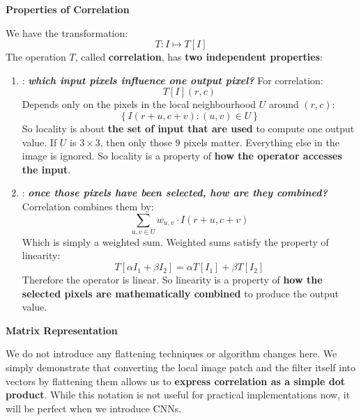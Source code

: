 \highspace
\begin{flushleft}
    \textcolor{Green3}{ \textbf{Properties of Correlation}}
\end{flushleft}
We have the transformation:
\begin{equation*}
    T: I \mapsto T[I]
\end{equation*}
The operation $T$, called \textbf{correlation}, has \textbf{two independent properties}:
\begin{enumerate}
    \item {}: \emph{\textbf{which input pixels influence one output pixel?}} For correlation:
    \begin{equation*}
        T[I](r,c)
    \end{equation*}
    Depends only on the pixels in the local neighbourhood $U$ around $(r,c)$:
    \begin{equation*}
        \left\{I(r+u, c+v) : (u,v) \in U\right\}
    \end{equation*}
    So locality is about \textbf{the set of input that are used} to compute one output value. If $U$ is $3 \times 3$, then only those $9$ pixels matter. Everything else in the image is ignored. So locality is a property of \textbf{how the operator accesses the input}.


    \item {}: \emph{\textbf{once those pixels have been selected, how are they combined?}} Correlation combines them by:
    \begin{equation*}
        \sum_{u,v \in U} w_{u,v} \cdot I(r+u, c+v)
    \end{equation*}
    Which is simply a weighted sum. Weighted sums satisfy the property of linearity:
    \begin{equation*}
        T[\alpha I_1 + \beta I_2] = \alpha T[I_1] + \beta T[I_2]
    \end{equation*}
    Therefore the operator is linear. So linearity is a property of \textbf{how the selected pixels are mathematically combined} to produce the output value.
\end{enumerate}

\highspace
\begin{flushleft}
    \textcolor{Green3}{ \textbf{Matrix Representation}}
\end{flushleft}
We do not introduce any flattening techniques or algorithm changes here. We simply demonstrate that converting the local image patch and the filter itself into vectors by flattening them allows us to \textbf{express correlation as a simple dot product}. While this notation is not useful for practical implementations now, it will be perfect when we introduce CNNs.

